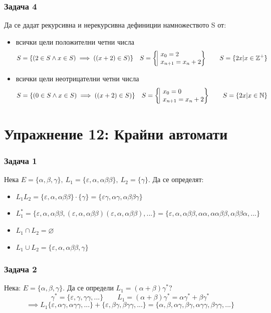 \documentclass[fleqn, 12pt]{article}
\theoremstyle{definition}
\begin{document}
\subsubsection*{Задача 4}
Да се дадат рекурсивна и нерекурсивна дефиниции намножеството S от:
\begin{itemize}
\item всички цели положителни четни числа
$$S = \{ (2 \in S  \land x \in S) \implies ((x+2) \in S) \} \quad S = \left\{ \begin{array}{|l@{}} x_0 = 2 \\ x_{n+1} = x_n + 2 \end{array} \right\} \qquad S = \{2x | x \in \mathbb{Z}^+ \}$$
\item всички цели неотрицателни четни числа
$$S = \{ (0 \in S  \land x \in S) \implies ((x+2) \in S) \} \quad S = \left\{ \begin{array}{|l@{}} x_0 = 0 \\ x_{n+1} = x_n + 2 \end{array} \right\} \qquad S = \{2x | x \in \mathbb{N}\}$$
\end{itemize}
\newpage
\section{ Упражнение 12: Крайни автомати}

\subsubsection*{Задача 1}
Нека $E = \{\alpha, \beta, \gamma \}, \ L_1 = \{ \varepsilon, \alpha, \alpha \beta \beta \}, \ L_2 = \{ \gamma\}$. Да се определят:
\begin{itemize}
\item $L_1 L_2 =  \{ \varepsilon, \alpha, \alpha \beta \beta \} \cdot \{ \gamma\} = \{ \varepsilon \gamma, \alpha \gamma, \alpha \beta \beta \gamma \}$
\item $L^* _1 = \{ \varepsilon, \alpha, \alpha \beta \beta, ( \varepsilon, \alpha, \alpha \beta \beta) ( \varepsilon, \alpha, \alpha \beta \beta), ...\} = 
\{\varepsilon, \alpha, \alpha \beta \beta, \alpha \alpha, \alpha \alpha \beta \beta, \alpha \beta \beta \alpha, ... \}$
\item $L_1 \cap L_2 = \varnothing$
\item $L_1 \cup L_2 = \{ \varepsilon, \alpha, \alpha \beta \beta, \gamma \}$
\end{itemize}

\subsubsection*{Задача 2}
Нека: $E = \{\alpha, \beta, \gamma \} $.  Да се определи $L_1 = (\alpha + \beta)\gamma^*$? 
$$\gamma^* = \{ \varepsilon, \gamma, \gamma \gamma, ... \} \qquad L_1 = (\alpha + \beta)\gamma^* =  \alpha \gamma^* + \beta \gamma^*$$ 
$$ \implies L_1 
\{ \varepsilon, \alpha \gamma, \alpha \gamma \gamma, ... \} + 
\{ \varepsilon, \beta \gamma, \beta \gamma \gamma, ... \} = 
\{ \alpha, \beta, \alpha \gamma, \beta \gamma, \alpha \gamma \gamma, \beta \gamma \gamma, ... \}$$
\end{document}

